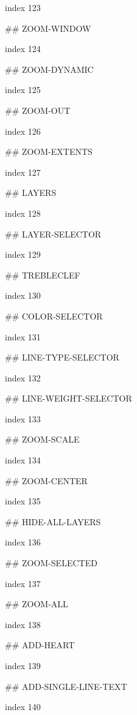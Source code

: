 index 123



## ZOOM-WINDOW

index 124



## ZOOM-DYNAMIC

index 125



## ZOOM-OUT

index 126



## ZOOM-EXTENTS

index 127



## LAYERS

index 128



## LAYER-SELECTOR

index 129



## TREBLECLEF

index 130



## COLOR-SELECTOR

index 131



## LINE-TYPE-SELECTOR

index 132



## LINE-WEIGHT-SELECTOR

index 133



## ZOOM-SCALE

index 134



## ZOOM-CENTER

index 135



## HIDE-ALL-LAYERS

index 136



## ZOOM-SELECTED

index 137



## ZOOM-ALL

index 138



## ADD-HEART

index 139



## ADD-SINGLE-LINE-TEXT

index 140



